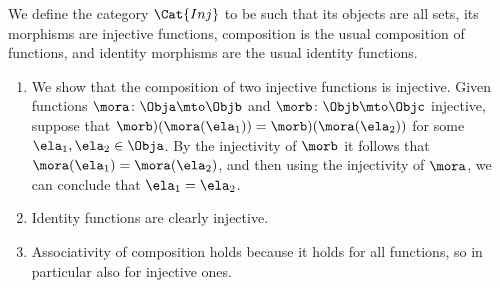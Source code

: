 \begin{solution}
    We define the category $\Cat{Inj}$ to be such that its objects are all sets, its morphisms are injective functions, composition is the usual composition of functions, and identity morphisms are the usual identity functions.
    \begin{enumerate}
        \item We show that the composition of two injective functions is injective.
              Given functions $\mora \colon \Obja \mto  \Objb$ and $\morb \colon \Objb \mto \Objc$ injective, suppose that $ \morb)(\mora (\ela_1)) = \morb)(\mora (\ela_2))$ for some $\ela_1, \ela_2 \in \Obja$.
              By the injectivity of $\morb$ it follows that $\mora (\ela_1) = \mora (\ela_2)$, and then using the injectivity of $\mora$, we can conclude that $\ela_1 = \ela_2$.
        \item Identity functions are clearly injective.
        \item Associativity of composition holds because it holds for all functions, so in particular also for injective ones.
    \end{enumerate}
\end{solution}

